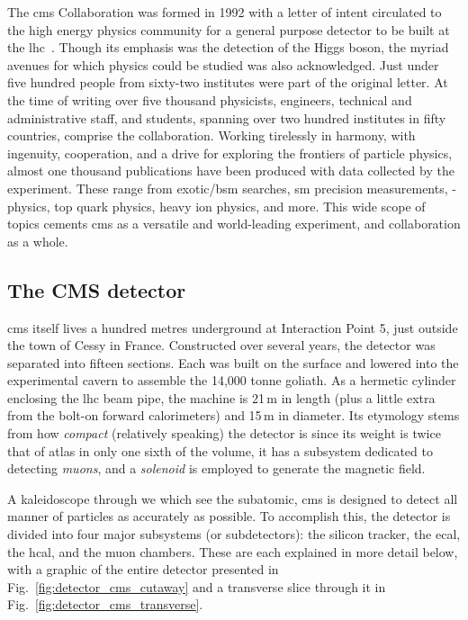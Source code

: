 The \acrfull{cms} Collaboration was formed in 1992 with a letter of intent circulated to the high energy physics community for a general purpose detector to be built at the \acrshort{lhc}~\cite{DellaNegra:290808}. Though its emphasis was the detection of the Higgs boson, the myriad avenues for which physics could be studied was also acknowledged. Just under five hundred people from sixty-two institutes were part of the original letter. At the time of writing over five thousand physicists, engineers, technical and administrative staff, and students, spanning over two hundred institutes in fifty countries, comprise the collaboration. Working tirelessly in harmony, with ingenuity, cooperation, and a drive for exploring the frontiers of particle physics, almost one thousand publications have been produced with data collected by the experiment. These range from exotic/\acrshort{bsm} searches, \acrlong{sm} precision measurements, \PB-physics, top quark physics, heavy ion physics, and more. This wide scope of topics cements \acrshort{cms} as a versatile and world-leading experiment, and collaboration as a whole.




\subsection{The CMS detector}
\label{subsec:cms_detector_itself}

\acrshort{cms} itself lives a hundred metres underground at Interaction Point 5, just outside the town of Cessy in France. Constructed over several years, the detector was separated into fifteen sections. Each was built on the surface and lowered into the experimental cavern to assemble the 14,000 tonne goliath. As a hermetic cylinder enclosing the \acrshort{lhc} beam pipe, the machine is 21\,m in length (plus a little extra from the bolt-on forward calorimeters) and 15\,m in diameter. Its etymology stems from how \emph{compact} (relatively speaking) the detector is since its weight is twice that of \acrshort{atlas} in only one sixth of the volume, it has a subsystem dedicated to detecting \emph{muons}, and a \emph{solenoid} is employed to generate the magnetic field.

A kaleidoscope through we which see the subatomic, \acrshort{cms} is designed to detect all manner of particles as accurately as possible. To accomplish this, the detector is divided into four major subsystems (or subdetectors): the silicon tracker, the \acrfull{ecal}, the \acrfull{hcal}, and the muon chambers. These are each explained in more detail below, with a graphic of the entire detector presented in Fig.~\ref{fig:detector_cms_cutaway} and a transverse slice through it in Fig.~\ref{fig:detector_cms_transverse}.

